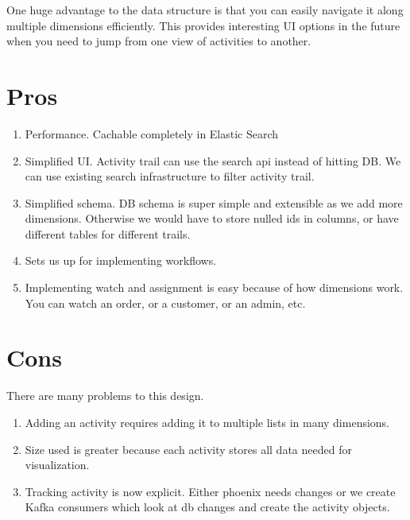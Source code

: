\documentclass[11pt]{article}
\begin{document}
One huge advantage to the data structure is that you can easily navigate it along multiple
dimensions efficiently. This provides interesting UI options in the future when you need
to jump from one view of activities to another.

\section{Pros}
\begin{enumerate}
    \item Performance. Cachable completely in Elastic Search
    \item Simplified UI. Activity trail can use the search api instead of hitting DB.
        We can use existing search infrastructure to filter activity trail.
    \item Simplified schema. DB schema is super simple and extensible as we add more dimensions.
        Otherwise we would have to store nulled ids in columns, or have different tables for
        different trails. 
    \item Sets us up for implementing workflows.
    \item Implementing watch and assignment is easy because of how dimensions work. You can
        watch an order, or a customer, or an admin, etc.
\end{enumerate}

\section{Cons}

There are many problems to this design.

\begin{enumerate}
    \item Adding an activity requires adding it to multiple
lists in many dimensions. 
    \item Size used is greater because each activity stores all data needed for visualization.
    \item Tracking activity is now explicit. Either phoenix needs changes or we create
           Kafka consumers which look at db changes and create the activity objects.
\end{enumerate}
\end{document}
